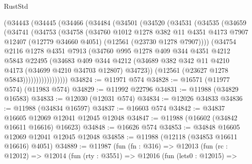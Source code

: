 \begin{lexlean}{RustStd}
\begin{coremodule}
        (@34443
          (@34445
            (@34466
              (@34484
                (@34501
                  (@34520
                    (@34531
                      (@34535
                        (@34659
                          (@34741
                            (@34753
                              (@34758
                                (@34760
                                  @1012
                                  @1278
                                  @382
                                  @11
                                  @4351
                                  @4173
                                  @7907
                                  @12407
                                  (@12779 @34660 @4051)
                                  (@12561 (@23730 @1278 @7907))))
                              (@34754
                                @2116
                                @1278
                                @4351
                                @7913
                                (@34760
                                  @995
                                  @1278
                                  @409
                                  @344
                                  @4351
                                  @4212
                                  @5843
                                  @22495
                                  (@34683
                                    @409
                                    @344
                                    @4212
                                    (@34689
                                      @382
                                      @342
                                      @11
                                      @4210
                                      @4173
                                      (@34699 @4210 @34703 @12807)
                                      @34723))
                                  (@12561 (@23627 @1278 @5843)))))))))))))))))
@34824 := @11971 @574
@34828 := @16571 (@11977 @574) (@11983 @574)
@34829 := @11992 @22796
@34831 := @11988 (@34829 @16583)
@34833 := @12030 (@12031 @574)
@34834 := @12026 @34833
@34836 := @11988 (@34834 @16597)
@34837 := @16603 @574
@34842 := @34837 @16605 @12069 @12041 @12045 @12048
@34847 := @11988 (@16602 (@34842 @16611 @16616) @16623)
@34848 := @16626 @574
@34853 := @34848 @16605 @12069 @12041 @12045 @12048
@34858 := @11988 (@12118 (@34853 @16611 @16616) @4051)
@34889 := @11987
    (fun (fn : @316) =>
    @12013
      (fun (rc : @12012) =>
      @12014
        (fun (rty : @3551) =>
        @12016
          (fun (lets0 : @12015) =>

\end{coremodule}
\end{lexlean}
